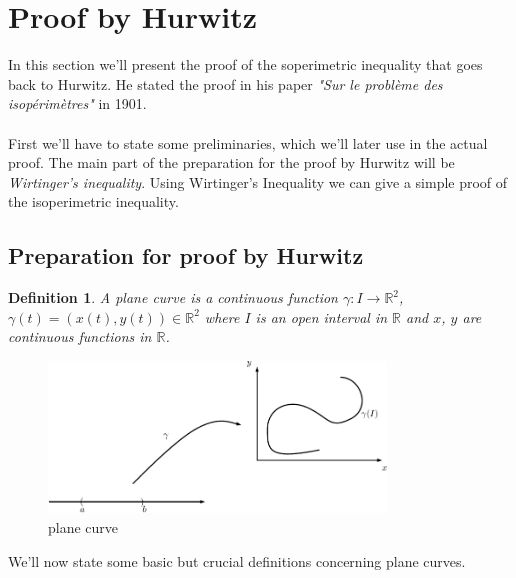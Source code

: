 \documentclass[12pt, a4paper, titlepage]{article}
\newtheorem{definition}{Definition}
\begin{document}

\newpage 
\section{Proof by Hurwitz}
In this section we'll present the proof of the soperimetric inequality that goes back to Hurwitz. He stated the proof in his paper \textit{"Sur le probl\`eme des isop\'erim\`etres"} in 1901. \\
\\
First we'll have to state some preliminaries, which we'll later use in the actual proof. The main part of the preparation for the proof by Hurwitz will be \textit{Wirtinger's inequality}. Using Wirtinger's Inequality we can give a simple proof of the isoperimetric inequality.

\subsection{Preparation for proof by Hurwitz}

\begin{definition}
A plane curve is a continuous function $\gamma: I \rightarrow \mathbb{R}^2$, $\gamma(t) = (x(t),y(t)) \in \mathbb{R}^2$ where $I$ is an open interval in $\mathbb{R}$ and $x$, $y$ are continuous functions in $\mathbb{R}$. 
\end{definition}
\begin{figure}[htbp] 
  \centering
     \includegraphics[width=0.8\textwidth]{images/curve.pdf}
  \caption{plane curve}
  \label{fig:Bild2}
\end{figure}
\noindent We'll now state some basic but crucial definitions concerning plane curves.
\end{document}

